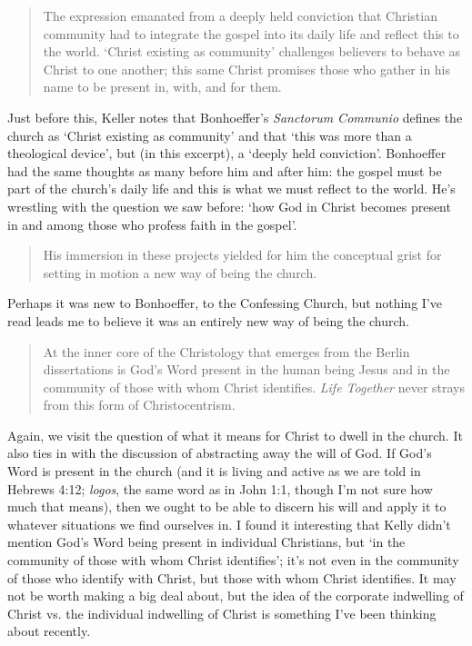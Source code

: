 \begin{quote}
    The expression emanated from a deeply held conviction that Christian
    community had to integrate the gospel into its daily life and reflect this
    to the world. `Christ existing as community' challenges believers to behave
    as Christ to one another; this same Christ promises those who gather in his
    name to be present in, with, and for them.
\end{quote}

Just before this, Keller notes that Bonhoeffer's \textit{Sanctorum Communio}
defines the church as `Christ existing as community' and that `this was more
than a theological device', but (in this excerpt), a `deeply held conviction'.
Bonhoeffer had the same thoughts as many before him and after him: the gospel
must be part of the church's daily life and this is what we must reflect to the
world. He's wrestling with the question we saw before: `how God in Christ
becomes present in and among those who profess faith in the gospel'.

\begin{quote}
    His immersion in these projects yielded for him the conceptual grist for
    setting in motion a new way of being the church.
\end{quote}

Perhaps it was new to Bonhoeffer, to the Confessing Church, but nothing I've
read leads me to believe it was an entirely new way of being the church.

\begin{quote}
    At the inner core of the Christology that emerges from the Berlin
    dissertations is God's Word present in the human being Jesus and in the
    community of those with whom Christ identifies. \textit{Life Together} never
    strays from this form of Christocentrism.
\end{quote}

Again, we visit the question of what it means for Christ to dwell in the church.
It also ties in with the discussion of abstracting away the will of God. If
God's Word is present in the church (and it is living and active as we are told
in Hebrews 4:12; \textit{logos}, the same word as in John 1:1, though I'm not
sure how much that means), then we ought to be able to discern his will and
apply it to whatever situations we find ourselves in. I found it interesting
that Kelly didn't mention God's Word being present in individual Christians, but
`in the community of those with whom Christ identifies'; it's not even in the
community of those who identify with Christ, but those with whom Christ
identifies. It may not be worth making a big deal about, but the idea of the
corporate indwelling of Christ vs. the individual indwelling of Christ is
something I've been thinking about recently.

